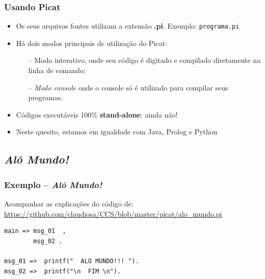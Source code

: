 \begin{frame}[fragile]
  \frametitle{Usando Picat}
  	\begin{itemize}
    
      
      
   
      \item Os seus arquivos fontes utilizam a extensão \textbf{.pi}. Exemplo: \texttt{programa.pi}
      \item Há dois modos principais de utilização do Picat: 
      
      \begin{itemize}
      	\item[--] Modo interativo, onde seu código é digitado e compilado diretamente na linha de 
        comando;
      	\item[--] \textit{Modo console} onde o console só é utilizado para compilar seus programas.
      \end{itemize}
      
      \pause
      \item Códigos executáveis 100\% \textbf{stand-alone}: ainda não!
      \item Neste quesito, estamos em igualdade com Java, Prolog e Python
     
    \end{itemize}
\end{frame}




\subsection{ \textit{Alô Mundo!}}
\begin{frame}[fragile]
\frametitle{Exemplo -- \textit{Alô Mundo!}}

Acompanhar as explicações do código de:\\
\url{https://github.com/claudiosa/CCS/blob/master/picat/alo_mundo.pi}

\begin{verbatim}
main => msg_01  , 
        msg_02 .
        
msg_01 =>  printf("  ALO MUNDO!!! ").
msg_02 =>  printf("\n  FIM \n").
\end{verbatim}

\end{frame}


